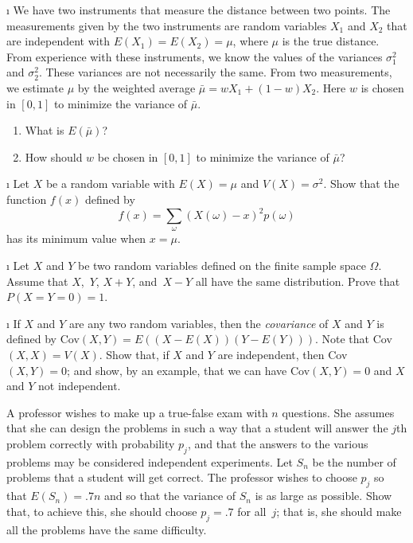 \begin{LJSItem}
\i\label{exer 6.2.21} We have two instruments that measure the distance between
two points.  The measurements given by the two instruments are random variables $X_1$
and
$X_2$ that are independent with $E(X_1) = E(X_2) = \mu$, where $\mu$ is the true
distance.  From experience with these instruments, we know the values of the
variances $\sigma_1^2$ and $\sigma_2^2$.  These variances are not necessarily the
same.  From two measurements, we estimate $\mu$ by the weighted average $\bar \mu
= wX_1 + (1 - w)X_2$.  Here $w$ is chosen in $[0,1]$ to minimize the variance of
$\bar \mu$.
\begin{enumerate}
\item What is $E(\bar \mu)$?

\item How should $w$ be chosen in $[0,1]$ to minimize the variance of
$\bar \mu$?
\end{enumerate}

\i\label{exer 6.2.22} Let $X$ be a random variable with $E(X) = \mu$ and $V(X) =
\sigma^2$.  Show that the function $f(x)$ defined by
$$ f(x) = \sum_\omega (X(\omega) - x)^2 p(\omega)
$$ has its minimum value when $x = \mu$.

\i\label{exer 6.2.23} Let $X$ and $Y$ be two random variables defined on the
finite sample space $\Omega$.  Assume that $X$,~$Y$, $X + Y$, and~$X - Y$ all have
the same distribution.  Prove that $P(X = Y = 0) = 1$.

\i\label{exer 6.2.24} If $X$ and $Y$ are any two random variables, then the {\em
covariance} of $X$ and $Y$ is defined by {\rm Cov}$(X,Y) = E((X - E(X))(Y -
E(Y)))$.  Note that {\rm Cov}$(X,X) = V(X)$.  Show that, if $X$ and
$Y$ are independent, then  {\rm Cov}$(X,Y) = 0$; and show, by an example, that we can
have {\rm Cov}$(X,Y) = 0$ and $X$ and $Y$ not independent.

\istar\label{exer 6.2.25} A professor wishes to make up a true-false exam
with
$n$ questions.  She assumes that she can design the problems in such a way that a student
will answer the $j$th problem correctly with probability $p_j$, and that the answers
to the various problems may be considered independent experiments.  Let $S_n$ be the
number of problems that a student will get correct.  The professor wishes to choose
$p_j$ so that $E(S_n) = .7n$ and so that the variance of $S_n$ is as large as
possible.  Show that, to achieve this, she should choose $p_j = .7$ for all~$j$; that
is, she should make all the problems have the same difficulty.


\end{LJSItem}
